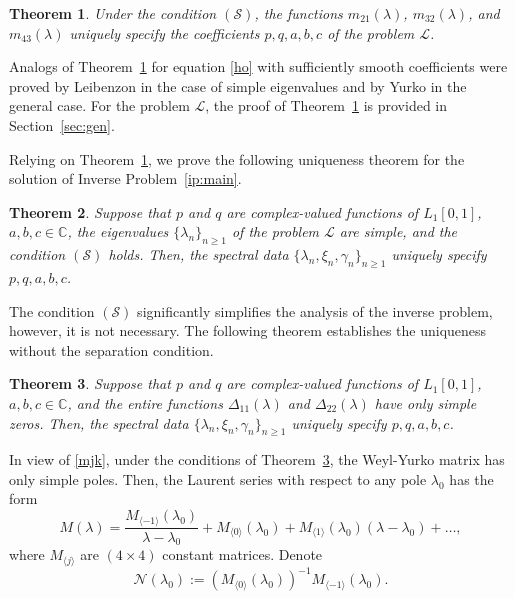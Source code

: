 \documentclass[a4paper,12pt]{article}
\newcommand{\ga}{\gamma}
\newcommand{\la}{\lambda}
\theoremstyle{plain}
\numberwithin{equation}{section}
\newtheorem{thm}{Theorem}[section]
\theoremstyle{definition}
\theoremstyle{remark}
\begin{document}
\begin{thm} \label{thm:Leib}
Under the condition $(\mathcal S)$, the functions $m_{21}(\la)$, $m_{32}(\la)$, and $m_{43}(\la)$ uniquely specify the coefficients $p,q,a,b,c$ of the problem $\mathcal L$.
\end{thm}

Analogs of Theorem~\ref{thm:Leib} for equation \eqref{ho} with sufficiently smooth coefficients were proved by Leibenzon \cite{Leib66} in the case of simple eigenvalues and by Yurko \cite{Yur02} in the general case. For the problem $\mathcal L$, the proof of Theorem~\ref{thm:Leib} is provided in Section~\ref{sec:gen}.

Relying on Theorem~\ref{thm:Leib}, we prove the following uniqueness theorem for the solution of Inverse Problem~\ref{ip:main}.

\begin{thm} \label{thm:uniq1}
Suppose that $p$ and $q$ are complex-valued functions of $L_1[0,1]$, $a, b, c \in \mathbb C$, the eigenvalues $\{ \la_n \}_{n \ge 1}$ of the problem $\mathcal L$ are simple, and the condition $(\mathcal S)$ holds. Then, the spectral data $\{ \la_n, \xi_n, \ga_n \}_{n \ge 1}$ uniquely specify $p, q, a, b, c$.
\end{thm}

The condition $(\mathcal S)$ significantly simplifies the analysis of the inverse problem, however, it is not necessary. The following theorem establishes the uniqueness without the separation condition.

\begin{thm} \label{thm:uniq2}
Suppose that $p$ and $q$ are complex-valued functions of $L_1[0,1]$, $a, b, c \in \mathbb C$, and the entire functions $\Delta_{11}(\la)$ and $\Delta_{22}(\la)$ have only simple zeros. Then, the spectral data $\{ \la_n, \xi_n, \ga_n \}_{n \ge 1}$ uniquely specify $p, q, a, b, c$.
\end{thm}

In view of \eqref{mjk}, under the conditions of Theorem~\ref{thm:uniq2}, the Weyl-Yurko matrix has only simple poles. Then, the Laurent series with respect to any pole $\la_0$ has the form
$$
M(\la) = \frac{M_{\langle -1 \rangle}(\la_0)}{\la - \la_0} + M_{\langle 0 \rangle}(\la_0) + M_{\langle 1\rangle}(\la_0) (\la - \la_0) + \dots,
$$
where $M_{\langle j \rangle}$ are $(4 \times 4)$ constant matrices. Denote
\begin{equation} \label{defN}
\mathcal N(\la_0) := (M_{\langle 0 \rangle}(\la_0))^{-1} M_{\langle -1 \rangle}(\la_0).
\end{equation}
\end{document}
